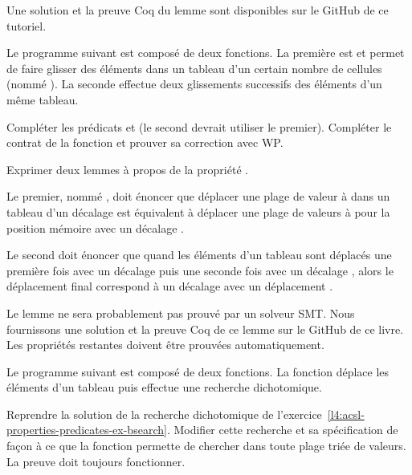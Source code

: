 Une solution et la preuve Coq du lemme sont disponibles sur le GitHub de ce tutoriel.


\label{l4:acsl-properties-lemmas-shift-trans}


Le programme suivant est composé de deux fonctions. La première est
 et permet de faire glisser des éléments dans un tableau
d'un certain nombre de cellules (nommé ). La seconde effectue deux
glissements successifs des éléments d'un même tableau.





Compléter les prédicats  et  (le second
devrait utiliser le premier). Compléter le contrat de la fonction
 et prouver sa correction avec WP.


Exprimer deux lemmes à propos de la propriété .


Le premier, nommé , doit énoncer que déplacer une plage de
valeur  à  dans un tableau 
d'un décalage  est équivalent à déplacer une plage de valeurs
 à  pour la position mémoire 
avec un décalage .


Le second doit énoncer que quand les éléments d'un tableau sont déplacés une première
fois avec un décalage  puis une seconde fois avec un décalage
, alors le déplacement final correspond à un décalage avec un
déplacement .


Le lemme  ne sera probablement pas prouvé par un solveur SMT.
Nous fournissons une solution et la preuve Coq de ce lemme sur le GitHub de ce livre.
Les propriétés restantes doivent être prouvées automatiquement.




Le programme suivant est composé de deux fonctions. La fonction
 déplace les éléments d'un tableau puis effectue
une recherche dichotomique.




Reprendre la solution de la recherche dichotomique de 
l'exercice~\ref{l4:acsl-properties-predicates-ex-bsearch}. Modifier cette
recherche et sa spécification de façon à ce que la fonction permette de
chercher dans toute plage triée de valeurs. La preuve doit toujours fonctionner.


